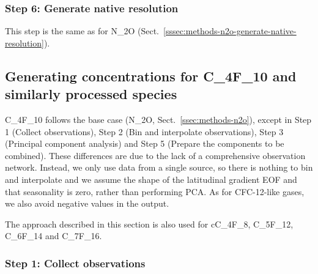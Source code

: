 \subsubsection{Step 6: Generate native resolution}
\label{sssec:methods-cfc12-like-generate-native-resolution}

This step is the same as for N_2O (Sect.~\ref{sssec:methods-n2o-generate-native-resolution}).

\subsection{Generating concentrations for C_4F_10 and similarly processed species}
\label{ssec:methods-c4f10-like}

C_4F_10 follows the base case (N_2O, Sect.~\ref{ssec:methods-n2o}),
except in Step 1 (Collect observations), Step 2 (Bin and interpolate observations),
Step 3 (Principal component analysis) and Step 5 (Prepare the components to be combined).
These differences are due to the lack of a comprehensive observation network.
Instead, we only use data from a single source,
so there is nothing to bin and interpolate
and we assume the shape of the latitudinal gradient EOF and that seasonality is zero, rather than performing PCA.
As for CFC-12-like gases, we also avoid negative values in the output.

The approach described in this section is also used for
cC_4F_8, C_5F_12, C_6F_14 and C_7F_16.

\subsubsection{Step 1: Collect observations}
\label{sssec:methods-c4f10-like-collect-observations}

